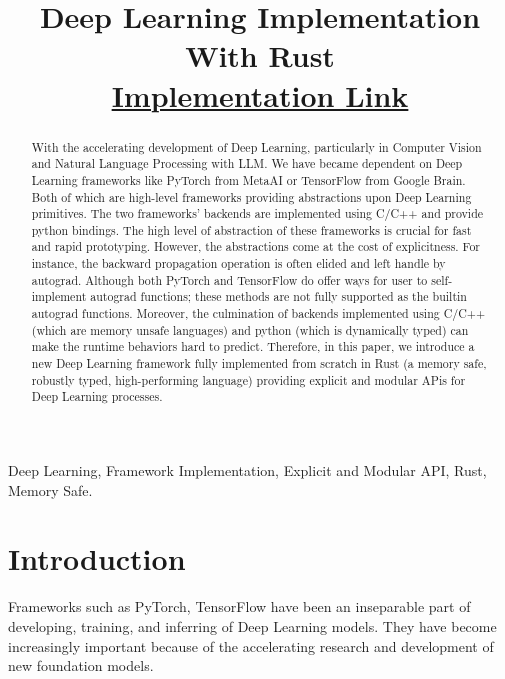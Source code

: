 \documentclass[conference]{IEEEtran}
\begin{document}
\title{
Deep Learning Implementation With Rust \\
{
\footnotesize \href{https://github.com/tung-ngt/ml-rs}{Implementation Link}
}
}

\author{
}

\maketitle

\begin{abstract}
With the accelerating development of Deep Learning, particularly in 
Computer Vision and Natural Language Processing with LLM.
We have became dependent on Deep Learning frameworks like PyTorch\cite{pytorch} from MetaAI or TensorFlow from Google Brain.
Both of which are high-level frameworks providing abstractions upon Deep Learning primitives.
The two frameworks' backends are implemented using C/C++ and provide python bindings.
The high level of abstraction of these frameworks is crucial for fast and rapid prototyping.
However, the abstractions come at the cost of explicitness.
For instance, the backward propagation operation is often elided and left handle by autograd.
Although both PyTorch and TensorFlow\cite{tf} do offer ways for user to self-implement autograd functions; these methods are not fully supported as the builtin autograd functions.
Moreover, the culmination of backends implemented using C/C++ (which are memory unsafe languages) and python (which is dynamically typed) can make the runtime behaviors hard to predict.
Therefore, in this paper, we introduce a new Deep Learning framework fully implemented from scratch in Rust (a memory safe, robustly typed, high-performing language) providing explicit and modular APis for Deep Learning processes.

\end{abstract}

\begin{IEEEkeywords}
Deep Learning, Framework Implementation, Explicit and Modular API, Rust, Memory Safe.
\end{IEEEkeywords}

\section{Introduction}
Frameworks such as PyTorch\cite{pytorch}, TensorFlow\cite{tf} have been an inseparable part of developing, training, and inferring of Deep Learning models. They have become increasingly important because of the accelerating research and development of new foundation models.
\end{document}
